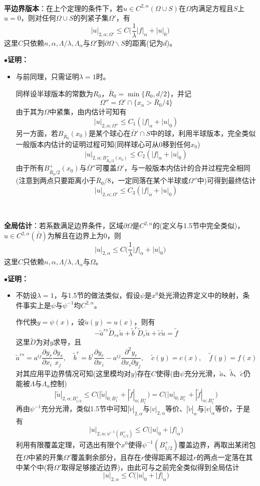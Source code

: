 \documentclass[a4paper,UTF8,fontset=windows,AutoFakeBold]{ctexart}
\newcommand{\proo}[1]{{\kaishu $\bullet$\textbf{证明：}
\begin{itemize}
    \item[] #1
\end{itemize}
}}
\begin{document}
\

\textbf{平边界版本}：在上个定理的条件下，若$u\in C^{2,\alpha}(\Omega\cup S)$在$\Omega$内满足方程且$S$上$u=0$，则对任何$\Omega\cup S$的列紧子集$\Omega'$，有
$$|u|_{2,\alpha;\Omega'}\le C\bigg(\frac{1}{\lambda}|f|_\alpha+|u|_0\bigg)$$
这里$C$只依赖$n,\alpha,\Lambda/\lambda,\Lambda_\alpha$与$\Omega'$到$\partial\Omega\backslash S$的距离(记为$d$)。

\proo{
    与前同理，只需证明$\lambda=1$时。

    同样设半球版本的常数为$R_0$，$\bar{R}_0=\min\{R_0,d/2\}$，并记
    $$\Omega''=\Omega'\cap\{x_n>\bar{R}_0/4\}$$
    由于其为$\Omega$中紧集，由内估计可知有
    $$|u|_{2,\alpha;\Omega''}\le C_1(|f|_\alpha+|u|_0)$$
    另一方面，若$B_{\bar{R}_0}(x_0)$是某个球心在$\bar\Omega'\cap S$中的球，利用半球版本，完全类似一般版本内估计的证明过程可知(同样球心可从0移到任何$x_0$)
    $$|u|_{2,\alpha;B_{\bar{R}_0/2}^+(x_0)}\le C_2(|f|_\alpha+|u|_0)$$
    由于所有$B_{\bar{R}_0/2}^+(x_0)$与$\bar\Omega''$可覆盖$\Omega'$，与一般版本内估计的合并过程完全相同(注意到两点只要距离小于$\bar{R}_0/8$，一定同落在某个半球或$\Omega''$中)可得到最终估计
    $$|u|_{2,\alpha;\Omega'}\le C_3(|f|_\alpha+|u|_0)$$
}

\

\textbf{全局估计}：若系数满足边界条件，区域$\partial\Omega$是$C^{2,\alpha}$的(定义与1.5节中完全类似)，$u\in C^{2,\alpha}(\bar\Omega)$为解且在边界上为0，则
$$|u|_{2,\alpha}\le C\bigg(\frac{1}{\lambda}|f|_\alpha+|u|_0\bigg)$$
这里$C$只依赖$n,\alpha,\Lambda/\lambda,\Lambda_\alpha$与$\Omega$。

\proo{
    不妨设$\lambda=1$，与1.5节的做法类似，假设$\psi$是$x^0$处光滑边界定义中的映射，条件事实上是$\psi$与$\psi^{-1}$均$C^{2,\alpha}$。

    作代换$y=\psi(x)$，设$\tilde{u}(y)=u(x)$，则有
    $$-\tilde{a}^{rs}\tilde{D}_{rs}\tilde{u}+\tilde{b}^r\tilde{D}_r\tilde{u}+\tilde{c}\tilde{u}=\tilde{f}$$
    这里$\tilde{D}$为对$y$求导，且
    $$\tilde{a}^{rs}=a^{ij}\frac{\partial y_r}{\partial x_i}\frac{\partial y_s}{x_j},\quad\tilde{b}^r=b^i\frac{\partial y_r}{\partial x_i}-a^{ij}\frac{\partial^2y_r}{\partial x_i\partial y_j},\quad\tilde{c}(y)=c(x),\quad\tilde{f}(y)=f(x)$$
    对其应用平边界情况可知(这里模均对$y$)存在$C$使得(由$\psi$充分光滑，$\tilde{a}$、$\tilde{b}$、$\tilde{c}$仍能被$\Lambda$与$\Lambda_\alpha$控制)
    $$|\tilde{u}|_{2,\alpha;B_{1/2}^+}\le C\big(|\tilde{u}|_{0;B_1^+}+|\tilde{f}|_{\alpha;B_1^+}\big)=C\big(|u|_{0;B_1^+}+|\tilde{f}|_{\alpha;B_1^+}\big)$$
    再由$\psi^{-1}$充分光滑，类似1.5节中可知$|\tilde{v}|_{2,\alpha}$与$|v|_{2,\alpha}$等价、$|\tilde{v}|_\alpha$与$|v|_\alpha$等价，于是有
    $$|u|_{2,\alpha;\psi^{-1}(B_{1/2}^+)}\le C\big(|u|_0+|f|_\alpha\big)$$
    利用有限覆盖定理，可选出有限个$x^0$使得$\psi^{-1}(B_{1/2}^+)$覆盖边界，再取出某闭包在$\Omega$中紧的开集$\Omega'$覆盖剩余部分，且存在$r$使得距离不超过$r$的两点一定落在其中某个中(将$\Omega'$取得足够接近边界)，由此可与之前完全类似得到全局估计
    $$|u|_{2,\alpha}\le C\big(|u|_0+|f|_\alpha\big)$$
}
\end{document}
